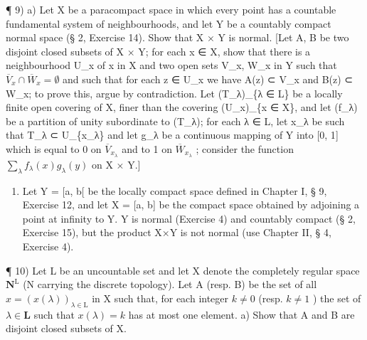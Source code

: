 ¶ 9) a) Let X be a paracompact space in which every point has a countable fundamental system of neighbourhoods, and let Y be a countably compact normal space (§ 2, Exercise 14). Show that X × Y is normal. {[}Let A, B be two disjoint closed subsets of X × Y; for each x ∈ X, show that there is a neighbourhood U\_x of x in X and two open sets V\_x, W\_x in Y such that \(\overline{V}_x \cap \overline{W}_x = \emptyset\) and such that for each z ∈ U\_x we have A(z) ⊂ V\_x and B(z) ⊂ W\_x; to prove this, argue by contradiction. Let (T\_λ)\_\{λ ∈ L\} be a locally finite open covering of X, finer than the covering (U\_x)\_\{x ∈ X\}, and let (f\_λ) be a partition of unity subordinate to (T\_λ); for each λ ∈ L, let x\_λ be such that T\_λ ⊂ U\_\{x\_λ\} and let g\_λ be a continuous mapping of Y into {[}0, 1{]} which is equal to 0 on \(\overline{V}_{x_λ}\) and to 1 on \(\overline{W}_{x_λ}\) ; consider the function \(\sum_{\lambda} f_\lambda(x) g_\lambda(y)\) on X × Y.{]}

\begin{enumerate}
\def\labelenumi{\alph{enumi})}
\setcounter{enumi}{1}
\tightlist
\item
  Let Y = {[}a, b{[} be the locally compact space defined in Chapter I, § 9, Exercise 12, and let X = {[}a, b{]} be the compact space obtained by adjoining a point at infinity to Y. Y is normal (Exercise 4) and countably compact (§ 2, Exercise 15), but the product X×Y is not normal (use Chapter II, § 4, Exercise 4).
\end{enumerate}

¶ 10) Let L be an uncountable set and let X denote the completely regular space \(\mathbf{N}^{\mathrm{L}}\) (N carrying the discrete topology). Let A (resp. B) be the set of all \(x = (x(\lambda))_{\lambda \in \mathrm{L}}\) in X such that, for each integer \(k \neq 0\) (resp. \(k \neq 1\) ) the set of \(\lambda \in \mathbf{L}\) such that \(x(\lambda) = k\) has at most one element. a) Show that A and B are disjoint closed subsets of X.

